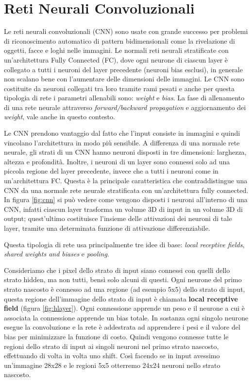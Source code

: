 \documentclass[twoside,twocolumn,10pt]{extarticle}
\theoremstyle{definition}
\begin{document}
\section{Reti Neurali Convoluzionali}\label{}
Le reti neurali convoluzionali (CNN) sono usate con grande successo per problemi di riconoscimento automatico di pattern bidimensionali come la rivelazione di oggetti, facce e loghi nelle immagini. Le normali reti neurali stratificate con un'architettura Fully Connected (FC), dove ogni neurone di ciascun layer è collegato a tutti i neuroni del layer precedente (neuroni bias esclusi), in generale non scalano bene con l'aumentare delle dimensioni delle immagini. Le CNN sono costituite da neuroni collegati tra loro tramite rami pesati e anche per questa tipologia di rete i parametri allenabili sono: \textit{weight} e \textit{bias}. La fase di allenamento di una rete neurale attraverso \textit{forward/backward propagation} e aggiornamento dei \textit{weight}, vale anche in questo contesto. 

Le CNN prendono vantaggio dal fatto che l'input consiste in immagini e quindi vincolano l'architettura in modo più sensibile. A differenza di una normale rete neurale, gli strati di un CNN hanno neuroni disposti in tre dimensioni: larghezza, altezza e profondità. Inoltre, i neuroni di un layer sono connessi solo ad una piccola regione del layer precedente, invece che a tutti i neuroni come in un'architettura FC.
Questa è la principale caratteristica che contraddistingue una CNN da una normale rete neurale stratificata con un'architettura fully connected. In figura \ref{fig:cnn} si può vedere come vengono disposti i neuroni all'interno di una CNN, infatti ciascun layer trasforma un volume 3D di input in un volume 3D di output; quest'ultimo costituisce l'insieme delle attivazioni dei neuroni di tale layer, tramite una determinata funzione di attivazione differenziabile.

Questa tipologia di rete usa principalmente tre idee di base: \textit{local receptive fields}, \textit{shared weights and biases} e \textit{pooling}. 

Consideriamo che i pixel dello strato di input siano connessi con quelli dello strato hidden, ma non tutti, bensì solo alcuni di questi. Ogni neurone del primo strato nascosto è connesso ad una regione (ad esempio 5x5) dello strato di input, questa regione dell'immagine dello strato di input è chiamata \textbf{local receptive field} (figura \ref{fig:hlayer}). Ogni connessione apprende un peso e il neurone a cui è associata la connessione apprende un bias totale. In sostanza ogni singolo neurone esegue la convoluzione e la rete è addestrata ad apprendere i pesi e il valore del bias per minimizzare la funzione di costo. Quindi vengono connesse tutte le regioni dello strato di input ai singoli neuroni nel primo strato nascosto, effettuando di volta in volta uno shift. Così facendo se in input avessimo un'immagine 28x28 e le regioni 5x5 otterremo 24x24 neuroni nello strato nascosto.
\end{document}
